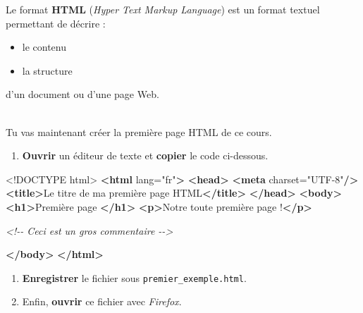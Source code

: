 \documentclass[a4paper,17pt]{extarticle}
\newenvironment{eleve}%
{\begin{activite}\color{noiramu}\\}
{\end{activite}}
\providecommand{\tightlist}{%
      \setlength{\itemsep}{0pt}\setlength{\parskip}{0pt}}
\newenvironment{Shaded}{}{}
\newcommand{\KeywordTok}[1]{\textcolor[rgb]{0.00,0.44,0.13}{\textbf{{#1}}}}
\newcommand{\DataTypeTok}[1]{\textcolor[rgb]{0.56,0.13,0.00}{{#1}}}
\newcommand{\StringTok}[1]{\textcolor[rgb]{0.25,0.44,0.63}{{#1}}}
\newcommand{\CommentTok}[1]{\textcolor[rgb]{0.38,0.63,0.69}{\textit{{#1}}}}
\newcommand{\OtherTok}[1]{\textcolor[rgb]{0.00,0.44,0.13}{{#1}}}
\newcommand{\NormalTok}[1]{{#1}}
\begin{document}
    Le format \textbf{HTML} (\emph{Hyper Text Markup Language}) est un
format textuel permettant de décrire :

\begin{itemize}
\tightlist
\item
  le contenu
\item
  la structure
\end{itemize}

d'un document ou d'une page Web.
\begin{eleve}
    Tu vas maintenant créer la première page HTML de ce cours.

\begin{enumerate}
\def\labelenumi{\arabic{enumi}.}
\tightlist
\item
  \textbf{Ouvrir} un éditeur de texte et \textbf{copier} le code
  ci-dessous.
\end{enumerate}

\begin{Shaded}
\begin{Highlighting}[]
\DataTypeTok{\textless{}!DOCTYPE }\NormalTok{html}\DataTypeTok{\textgreater{}}
\KeywordTok{\textless{}html}\OtherTok{ lang=}\StringTok{"fr"}\KeywordTok{\textgreater{}}
\KeywordTok{\textless{}head\textgreater{}}
    \KeywordTok{\textless{}meta}\OtherTok{ charset=}\StringTok{"UTF{-}8"}\KeywordTok{/\textgreater{}}
    \KeywordTok{\textless{}title\textgreater{}}\NormalTok{Le titre de ma première page HTML}\KeywordTok{\textless{}/title\textgreater{}}
\KeywordTok{\textless{}/head\textgreater{}}
\KeywordTok{\textless{}body\textgreater{}}
    \KeywordTok{\textless{}h1\textgreater{}}\NormalTok{Première page }\KeywordTok{\textless{}/h1\textgreater{}}
    \KeywordTok{\textless{}p\textgreater{}}\NormalTok{Notre toute première page !}\KeywordTok{\textless{}/p\textgreater{}}

    \CommentTok{\textless{}!{-}{-} Ceci est un gros commentaire {-}{-}\textgreater{}}
    
\KeywordTok{\textless{}/body\textgreater{}}
\KeywordTok{\textless{}/html\textgreater{}}
\end{Highlighting}
\end{Shaded}

\begin{enumerate}
\def\labelenumi{\arabic{enumi}.}
\setcounter{enumi}{1}
\tightlist
\item
  \textbf{Enregistrer} le fichier sous \texttt{premier\_exemple.html}.
\item
  Enfin, \textbf{ouvrir} ce fichier avec \emph{Firefox}.
\end{enumerate}
        

\end{eleve}
\end{document}
